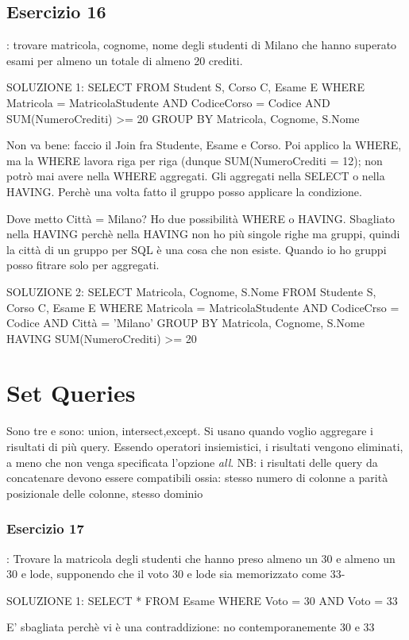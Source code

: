 \documentclass[12pt,a4paper]{book}
\begin{document}
\subsection{Esercizio 16}: trovare matricola, cognome, nome degli studenti di Milano che hanno superato esami per almeno un totale di almeno 20 crediti.

SOLUZIONE 1:
SELECT 
FROM Student S, Corso C, Esame E
WHERE Matricola = MatricolaStudente AND CodiceCorso = Codice AND SUM(NumeroCrediti) >= 20 
GROUP BY Matricola, Cognome, S.Nome

Non va bene: faccio il Join fra Studente, Esame e Corso. Poi applico la WHERE, ma la WHERE lavora riga per riga (dunque SUM(NumeroCrediti = 12); non potrò mai avere nella WHERE aggregati.
Gli aggregati nella SELECT o nella HAVING. Perchè una volta fatto il gruppo posso applicare la condizione.

Dove metto Città = Milano? Ho due possibilità WHERE o HAVING.
Sbagliato nella HAVING perchè nella HAVING non ho più singole righe ma gruppi, quindi la città di un gruppo per SQL è una cosa che non esiste. Quando io ho gruppi posso fitrare solo per aggregati.

SOLUZIONE 2:
SELECT Matricola, Cognome, S.Nome
FROM Studente S, Corso C, Esame E
WHERE Matricola = MatricolaStudente AND CodiceCrso = Codice AND Città = 'Milano'
GROUP BY Matricola, Cognome, S.Nome
HAVING SUM(NumeroCrediti) >= 20

\section{Set Queries}
Sono tre e sono: union, intersect,except.
Si usano quando voglio aggregare i risultati di più query. Essendo operatori insiemistici, i risultati vengono eliminati, a meno che non venga specificata l'opzione \emph{all}. 
NB: i risultati delle query da concatenare devono essere compatibili ossia:
    stesso numero di colonne
    a parità posizionale delle colonne, stesso dominio

\subsubsection{Esercizio 17}: Trovare la matricola degli studenti che hanno preso almeno un 30 e almeno un 30 e lode, supponendo che il voto 30 e lode sia memorizzato come 33-


SOLUZIONE 1: 
SELECT *
FROM Esame
WHERE Voto = 30 AND Voto = 33

E' sbagliata perchè vi è una contraddizione: no contemporanemente 30 e 33
\end{document}
